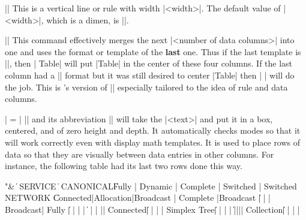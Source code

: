 \mbr
\ext\@||
\nbr
This is a vertical line or rule with width |<width>|. The default value of
|<width>|, which is a dimen, is |\tr|.

\mbr
\ext\@||
\nbr
This command effectively merges the next 
|<number of data columns>| into one and uses the format or template of the
{\bf last} one. Thus if the last template is |\center|, then 
| Table| will put |Table| in the center of these four columns. If the
last column had a |\left| format but it was still desired to center |Table|
then | | will do the job. This is \intex's version of
|\multispan| especially tailored to the idea of rule and data columns.

\mbr
\ext\@|
 \zb = \zerocenteredbox|
\nbr
|\zerocenteredbox| and its abbreviation |\zb| will take the |<text>| and put
it in a box, centered, and of zero height and depth. It automatically checks
modes so that it will work correctly even with display math templates. It is
used to place rows of data so that they are visually between data entries in
other columns. For instance, the following table had its last two rows done
this way.

\bigbreak
\centerline{
\begintable
\begintableformat 
 \left"&\center
\endtableformat
\fulltablerule{2.5\tr}
\br{\:\|}        \|                 SERVICE                      \er{\|}
\br{\|}          \| \-                                           \er{\|}
\br{\:\|}CANONICAL\| Fully  | Dynamic  | Complete | Switched | Switched \er{\|}
\br{\:\|}NETWORK \|Connected|Allocation|Broadcast | Complete |Broadcast \er{\|}
\br{\:\|}        \|         |          |          | Broadcast|          \er{\|}
\fulltablerule{3\tr}%
\br{\:\|} Fully  \|         |          |          |          |          \er{\|}
\br{\|}          \| |  |  ||\er{\|}
\br{\:\|}Connected\|        |          |          |          |          \er{\|}
\- %
\br{\:\|}Simplex Tree\|     |          |          |          |          \er{\|}
\br{\|}       \|||||\er{\|}
\br{\:\|}Collection\|       |          |          |          |          \er{\|}
\fulltablerule{2.5\tr} %
\endtable
}



